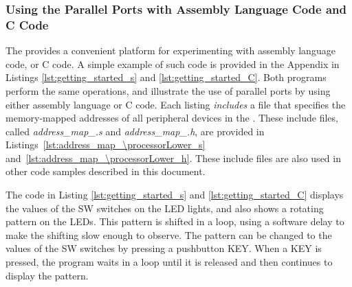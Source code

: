 \subsubsection{Using the Parallel Ports with Assembly Language Code and C Code}

The {\it \systemNameFull} provides a convenient platform for experimenting with {\processor}
assembly language code, or C code.  A simple example of such code is provided in the Appendix in
Listings \ref{lst:getting_started_s} and \ref{lst:getting_started_C}. Both programs perform
the same operations, and illustrate the use of parallel ports by using either assembly language 
or C code. Each listing {\it includes} a file that specifies the memory-mapped addresses 
of all peripheral devices in the {\it \systemNameFull}. These include files, called {\it
address\_map\_\processorLower.s}
and {\it address\_map\_\processorLower.h}, are provided in
Listings~\ref{lst:address_map_\processorLower_s}
and~\ref{lst:address_map_\processorLower_h}. These include files are also used in other code
samples described in this document.  

The code in Listing \ref{lst:getting_started_s} and \ref{lst:getting_started_C}
displays the values of the SW switches on the LED lights, and also
shows a rotating pattern on the LEDs. This pattern is shifted in a loop, using a software delay
to make the shifting slow enough to observe. The pattern can be changed to the values of the 
SW switches by pressing a pushbutton KEY. When a KEY is pressed, the program waits in a
loop until it is released and then continues to display the pattern.


